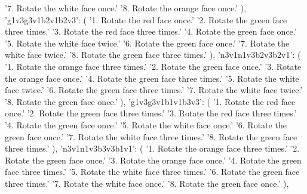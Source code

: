 {{            '7. Rotate the white face once.\n'
            '8. Rotate the orange face once.'
        ),
        'g1v3g3v1b2v1b2v3': (
            '1. Rotate the red face once.\n'
            '2. Rotate the green face three times.\n'
            '3. Rotate the red face three times.\n'
            '4. Rotate the green face once.\n'
            '5. Rotate the white face twice.\n'
            '6. Rotate the green face once.\n'
            '7. Rotate the white face twice.\n'
            '8. Rotate the green face three times.'
        ),
        'n3v1n1v3b2v3b2v1': (
            '1. Rotate the orange face three times.\n'
            '2. Rotate the green face once.\n'
            '3. Rotate the orange face once.\n'
            '4. Rotate the green face three times.\n'
            '5. Rotate the white face twice.\n'
            '6. Rotate the green face three times.\n'
            '7. Rotate the white face twice.\n'
            '8. Rotate the green face once.'
        ),
        'g1v3g3v1b1v1b3v3': (
            '1. Rotate the red face once.\n'
            '2. Rotate the green face three times.\n'
            '3. Rotate the red face three times.\n'
            '4. Rotate the green face once.\n'
            '5. Rotate the white face once.\n'
            '6. Rotate the green face once.\n'
            '7. Rotate the white face three times.\n'
            '8. Rotate the green face three times.'
        ),
        'n3v1n1v3b3v3b1v1': (
            '1. Rotate the orange face three times.\n'
            '2. Rotate the green face once.\n'
            '3. Rotate the orange face once.\n'
            '4. Rotate the green face three times.\n'
            '5. Rotate the white face three times.\n'
            '6. Rotate the green face three times.\n'
            '7. Rotate the white face once.\n'
            '8. Rotate the green face once.'
        ),
        
}}
